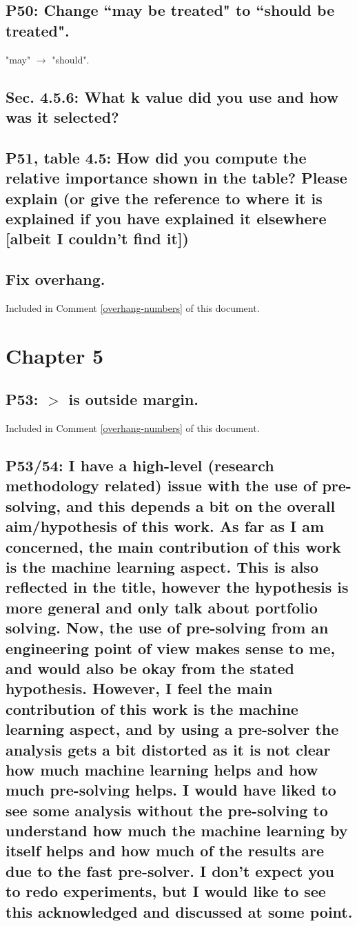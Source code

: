 \documentclass[]{article}
\begin{document}
\subsection{P50: Change ``may be treated" to ``should be treated".} 

"may" $\rightarrow$ "should".
	
\subsection{Sec. 4.5.6: What k value did you use and how was it selected?}

\subsection{P51, table 4.5: How did you compute the relative importance shown in the table? Please explain (or give the reference to where it is explained if you have explained it elsewhere [albeit I couldn't find it])}

\subsection{Fix overhang.}

Included in Comment \ref{overhang-numbers} of this document.

\section{Chapter 5}

\subsection{P53: $>$ is outside margin.}

Included in Comment \ref{overhang-numbers} of this document.

\subsection{P53/54: I have a high-level (research methodology related) issue with the use of pre-solving, and this depends a bit on the overall aim/hypothesis of this work. As far as I am concerned, the main contribution of this work is the machine learning aspect. This is also reflected in the title, however the hypothesis is more general and only talk about portfolio solving. Now, the use of pre-solving from an engineering point of view makes sense to me, and would also be okay from the stated hypothesis. However, I feel the main contribution of this work is the machine learning aspect, and by using a pre-solver the analysis gets a bit distorted as it is not clear how much machine learning helps and how much pre-solving helps. I would have liked to see some analysis without the pre-solving to understand how much the machine learning by itself helps and how much of the results are due to the fast pre-solver. I don't expect you to redo experiments, but I would like to see this acknowledged and discussed at some point.}
\end{document}

